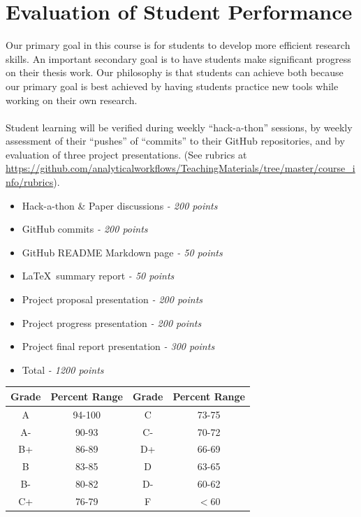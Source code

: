 \documentclass[10pt]{article}
\begin{document}
\section*{Evaluation of Student Performance}
Our primary goal in this course is for students to develop more efficient research skills.  
An important secondary goal is to have students make significant progress on their thesis work.  
Our philosophy is that students can achieve both because our primary goal is best achieved by having 
students practice new tools while working on their own research.
\\\\
Student learning will be verified during weekly ``hack-a-thon'' sessions, by weekly assessment of their 
``pushes'' of ``commits'' to their GitHub repositories, and by evaluation of three project presentations.  
(See rubrics at 
\url{https://github.com/analyticalworkflows/TeachingMaterials/tree/master/course_info/rubrics}).

\begin{itemize}[leftmargin=2cm]
\itemsep0em
\item Hack-a-thon \& Paper discussions \emph{- 200 points}
\item GitHub commits \emph{- 200 points}
\item GitHub README Markdown page \emph{- 50 points}
\item \LaTeX\ summary report \emph{- 50 points}
\item Project proposal presentation \emph{- 200 points}
\item Project progress presentation \emph{- 200 points}
\item Project final report presentation \emph{- 300 points}
\item Total \emph{- 1200 points}
\end{itemize}

\begin{center}
\begin{tabular}{|c|c||c|c|}
	\hline
	Grade &  Percent Range & Grade  & Percent Range   \\
	\hline
	\hline
	A & 94-100 &  C &  73-75 \\
	\hline
	A-&  90-93&  C-&  70-72  \\
	\hline
	B+& 86-89 &  D+& 66-69 \\
	\hline
	B & 83-85 &  D&  63-65 \\
	\hline
	B- & 80-82 & D- &  60-62 \\
	\hline
	C+&  76-79&  F & $< 60$ \\
	\hline
	\hline
\end{tabular}
\end{center}
\end{document}
